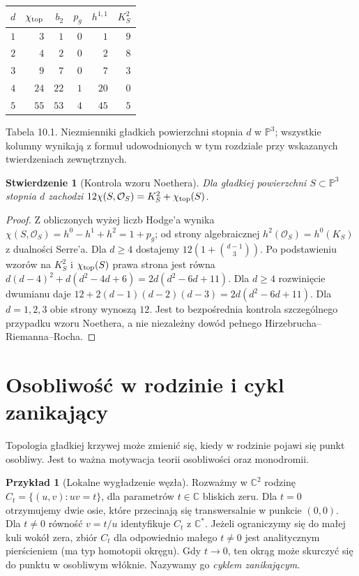\documentclass[11pt,a4paper,openany]{report}
\numberwithin{equation}{section}
\theoremstyle{plain}
\newtheorem{stwierdzenie}[twierdzenie]{Stwierdzenie}
\theoremstyle{definition}
\newtheorem{przyklad}[twierdzenie]{Przykład}
\theoremstyle{remark}
\newcommand{\C}{\mathbb C}
\newcommand{\PP}{\mathbb P}
\begin{document}
\begin{center}
\small
\begin{tabular}{c|r|r|r|r|r}
$d$ & $\chi_{\rm top}$ & $b_2$ & $p_g$ & $h^{1,1}$ & $K_S^2$\\\hline
$1$ & $3$ & $1$ & $0$ & $1$ & $9$\\
$2$ & $4$ & $2$ & $0$ & $2$ & $8$\\
$3$ & $9$ & $7$ & $0$ & $7$ & $3$\\
$4$ & $24$ & $22$ & $1$ & $20$ & $0$\\
$5$ & $55$ & $53$ & $4$ & $45$ & $5$
\end{tabular}

\smallskip
{\small Tabela 10.1. Niezmienniki gładkich powierzchni
stopnia $d$ w $\PP^3$; wszystkie kolumny wynikają
z formuł udowodnionych w tym rozdziale przy wskazanych
twierdzeniach zewnętrznych.}\par
\end{center}

\begin{stwierdzenie}[Kontrola wzoru Noethera]
Dla gładkiej powierzchni $S\subset\PP^3$ stopnia $d$
zachodzi $12\chi(S,\mathcal O_S)=K_S^2+\chi_{\rm top}(S)$.
\end{stwierdzenie}
\begin{proof}
Z obliczonych wyżej liczb Hodge'a wynika
$\chi(S,\mathcal O_S)=h^0-h^1+h^2=1+p_g$;
od strony algebraicznej $h^2(\mathcal O_S)=h^0(K_S)$
z dualności Serre'a. Dla $d\ge4$ dostajemy
$12(1+\binom{d-1}{3})$.
Po podstawieniu wzorów na $K_S^2$ i
$\chi_{\rm top}(S)$ prawa strona jest równa
$d(d-4)^2+d(d^2-4d+6)=2d(d^2-6d+11)$.
Dla $d\ge4$ rozwinięcie dwumianu daje
$12+2(d-1)(d-2)(d-3)=2d(d^2-6d+11)$.
Dla $d=1,2,3$ obie strony wynoszą $12$.
Jest to bezpośrednia kontrola szczególnego przypadku
wzoru Noethera, a nie niezależny dowód pełnego
Hirzebrucha--Riemanna--Rocha.
\end{proof}

\section{Osobliwość w rodzinie i cykl zanikający}
\label{sec:ga10-vanishing}

Topologia gładkiej krzywej może zmienić się, kiedy
w rodzinie pojawi się punkt osobliwy. Jest to ważna
motywacja teorii osobliwości oraz monodromii.

\begin{przyklad}[Lokalne wygładzenie węzła]
\label{prz:ga10-node}
Rozważmy w $\C^2$ rodzinę $C_t=\{(u,v):uv=t\}$,
dla parametrów $t\in\C$ bliskich zeru.
Dla $t=0$ otrzymujemy dwie osie, które przecinają się
transwersalnie w punkcie $(0,0)$. Dla $t\ne0$
równość $v=t/u$ identyfikuje $C_t$ z $\C^*$.
Jeżeli ograniczymy się do małej kuli wokół zera,
zbiór $C_t$ dla odpowiednio małego $t\ne0$ jest
analitycznym pierścieniem (ma typ homotopii okręgu).
Gdy $t\to0$, ten okrąg może skurczyć się do punktu
w osobliwym włóknie. Nazywamy go \emph{cyklem zanikającym}.
\end{przyklad}
\end{document}

